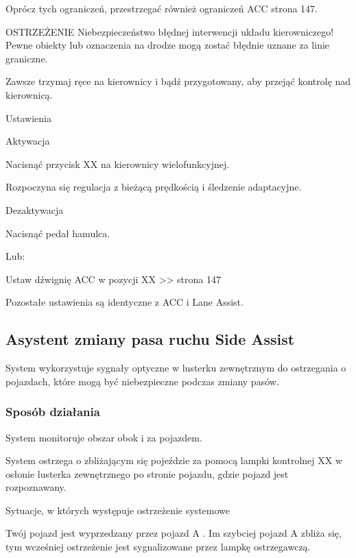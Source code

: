 Oprócz tych ograniczeń, przestrzegać również ograniczeń ACC \guillemotright strona 147.

OSTRZEŻENIE
Niebezpieczeństwo błędnej interwencji układu kierowniczego!
Pewne obiekty lub oznaczenia na drodze mogą zostać błędnie uznane za linie graniczne.
\begin{itemizeTriangle}
	\itemTriangle Zawsze trzymaj ręce na kierownicy i bądź przygotowany, aby przejąć kontrolę nad kierownicą.
\end{itemizeTriangle}

Ustawienia

Aktywacja
\begin{itemizeArrow}
	\itemArrow Nacisnąć przycisk XX na kierownicy wielofunkcyjnej.
\end{itemizeArrow}
Rozpoczyna się regulacja z bieżącą prędkością i śledzenie adaptacyjne.

Dezaktywacja
\begin{itemizeArrow}
	\itemArrow Nacisnąć pedał hamulca.
\end{itemizeArrow}
Lub:
\begin{itemizeArrow}
	\itemArrow Ustaw dźwignię ACC w pozycji XX >> strona 147
\end{itemizeArrow}

Pozostałe ustawienia są identyczne z ACC i Lane Assist.

\subsection{Asystent zmiany pasa ruchu Side Assist}

System wykorzystuje sygnały optyczne w lusterku zewnętrznym do ostrzegania o pojazdach, które mogą być niebezpieczne podczas zmiany pasów.

\subsubsection{Sposób działania}

System monitoruje obszar obok i za pojazdem.

System ostrzega o zbliżającym się pojeździe za pomocą lampki kontrolnej XX w osłonie lusterka zewnętrznego po stronie pojazdu, gdzie pojazd jest rozpoznawany.

Sytuacje, w których występuje ostrzeżenie systemowe

Twój pojazd jest wyprzedzany przez pojazd A . Im szybciej pojazd A zbliża się, tym wcześniej ostrzeżenie jest sygnalizowane przez lampkę ostrzegawczą.

